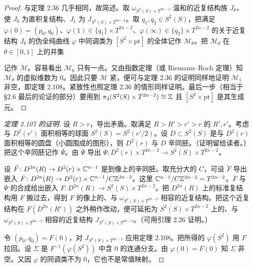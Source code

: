 \begin{proof}
  与定理 2.36 几乎相同，故简述。取 $\omega_{S^2(S)\times T^{2n-2}}$ 温和的近复结构族 $J_\theta$，使 $J_0$ 为直积复结构、$J_1$ 为 $J_{S^2(S)\times T^{2n-2}}$。取 $q_1,q_2\in S^2(S)$，把满足 $\varphi(0)=(p_0,q_0)$、$\varphi(1)\in\{q_1\}\times T^{2n-2}$、$\varphi(\infty)\in\{q_2\}\times T^{2n-2}$ 的关于近复结构 $J_\theta$ 的伪全纯曲线 $\varphi$ 中同调类为 $[S^2\times\mathrm{pt}]$ 的全体记作 $\mathcal{M}_\theta$。把 $\mathcal{M}_\theta$ 在 $\theta\in[0,1]$ 上的并集

  记作 $\mathcal{M}$。容易看出 $\mathcal{M}_0$ 只有一点。又由指数定理（或 Riemann–Roch 定理）知 $\mathcal{M}_\theta$ 的虚拟维数为 $0$。因此只要 $\mathcal{M}$ 紧，便可与定理 2.36 的证明同样地证明 $\mathcal{M}_1$ 非空，即定理 2.108。紧致性也照定理 2.36 的情形同样证明。最后一步（相当于 §2.6 最后的论证的部分）要用到 $\pi_2(S^2(S)\times T^{2n-2})\cong\mathbb{Z}$ 且 $[S^2\times\mathrm{pt}]$ 是其生成元。
\end{proof}

\begin{proof}[定理 2.107 的证明]
  设 $R>r$，导出矛盾。取满足 $R>R'>r'>r$ 的 $R',r'$。考虑与 $D^2(r')$ 面积相等的球面 $S^2(S)=S^2(r'/2)$。设 $D\subset S^2(S)$ 是与 $D^2(r)$ 面积相等的圆盘（小圆围成的图形），则 $D^2(r)$ 与 $D$ 辛同胚。（证明留给读者。）把这个辛同胚记作 $\bar\Psi$。由 $\bar\Psi$ 导出 $\Psi\colon D^2(r)\times T^{2n-2}\to S^2(S)\times T^{2n-2}$。

  设 $\tilde F\colon D^{2n}(R)\to D^2(r)\times\mathbb{C}^{n-1}$ 是到像上的辛同胚。取充分大的 $C$，可设 $\tilde F$ 导出嵌入 $\bar F\colon D^{2n}(R)\to D^2(r)\times\mathbb{C}^{n-1}/C\mathbb{Z}^{2n-2}$。这里 $\mathbb{C}^{n-1}/C\mathbb{Z}^{2n-2}=T^{2n-2}$。$\bar F$ 与 $\Psi$ 的合成给出嵌入 $F\colon D^{2n}(R)\to S^2(S)\times T^{2n-2}$。把 $D^{2n}(R)$ 上的标准复结构用 $F$ 搬过去，得到 $F$ 的像上的、与 $\omega_{S^2(S)\times T^{2n-2}}$ 相容的近复结构。把这个近复结构在 $F(D^{2n}(R'))$ 之外稍作改动，便可延拓为 $S^2(S)\times T^{2n-2}$ 上的、与 $\omega_{S^2(S)\times T^{2n-2}}$ 相容的近复结构 $J_{S^2(S)\times T^{2n-2}}$。（可用引理 2.26 证明。）

  令 $(p_0,q_0)=F(0)$，对 $J_{S^2(S)\times T^{2n-2}}$ 应用定理 2.108。把所得的 $\varphi(S^2)$ 用 $F$ 拉回。设 $\Sigma$ 是 $F^{-1}(\varphi(S^2))$ 中含 $0$ 的连通分支。由 $\varphi(0)=F(0)$ 知 $\Sigma$ 非空。又因 $\varphi$ 的同调类不为 $0$，它也不是常值映射。
\end{proof}


